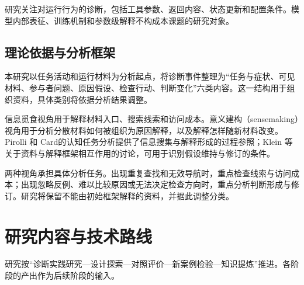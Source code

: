 研究关注对运行行为的诊断，包括工具参数、返回内容、状态更新和配置条件。模型内部表征、训练机制和参数级解释不构成本课题的研究对象。

\subsection{理论依据与分析框架}

本研究以任务活动和运行材料为分析起点，将诊断事件整理为“任务与症状、可见材料、参与者问题、原因假设、检查行动、判断变化”六类内容。这一结构用于组织资料，具体类别将依据分析结果调整。

信息觅食视角用于解释材料入口、搜索线索和访问成本。意义建构（sensemaking）视角用于分析分散材料如何被组织为原因解释，以及解释怎样随新材料改变。Pirolli 和 Card\cite{ref17}的认知任务分析提供了信息搜集与解释形成的过程参照；Klein 等\cite{ref11}关于资料与解释框架相互作用的讨论，可用于识别假设维持与修订的条件。

两种视角承担具体分析任务。出现重复查找和无效导航时，重点检查线索与访问成本；出现忽略反例、难以比较原因或无法决定检查方向时，重点分析判断形成与修订。研究将保留不能由初始框架解释的资料，并据此调整分类。

\section{研究内容与技术路线}

研究按“诊断实践研究—设计探索—对照评价—新案例检验—知识提炼”推进。各阶段的产出作为后续阶段的输入。

